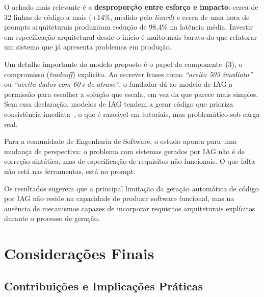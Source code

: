 \documentclass[sigconf]{acmart}
\begin{document}
O achado mais relevante é a \textbf{desproporção entre esforço e impacto}:
cerca de 32 linhas de código a mais (+14\%, medido pelo \textit{lizard}) e cerca de uma hora de prompts arquiteturais
produziram redução de 98,4\% na latência média. Investir em especificação
arquitetural desde o início é muito mais barato do que refatorar um sistema
que já apresenta problemas em produção.

Um detalhe importante do modelo proposto é o papel da componente~(3), o compromisso (\textit{tradeoff})
explícito. Ao escrever frases como \textit{``aceito 503 imediato''} ou
\textit{``aceito dados com 60\,s de atraso''}, o fundador dá ao modelo de IAG
a permissão para escolher a solução que escala, em vez da que parece mais simples.
Sem essa declaração, modelos de IAG tendem a gerar código que prioriza consistência
imediata~\cite{Nascimento2024}, o que é razoável em tutoriais, mas problemático
sob carga real.

Para a comunidade de Engenharia de Software, o estudo aponta para uma mudança de
perspectiva: o problema com sistemas gerados por IAG não é de correção sintática,
mas de especificação de requisitos não-funcionais. O que falta não está nas
ferramentas, está no prompt.

Os resultados sugerem que a principal limitação da geração automática de código por
IAG não reside na capacidade de produzir software
funcional, mas na ausência de mecanismos capazes de incorporar requisitos
arquiteturais explícitos durante o processo de geração.

\section{Considerações Finais}

\subsection{Contribuições e Implicações Práticas}
\end{document}
